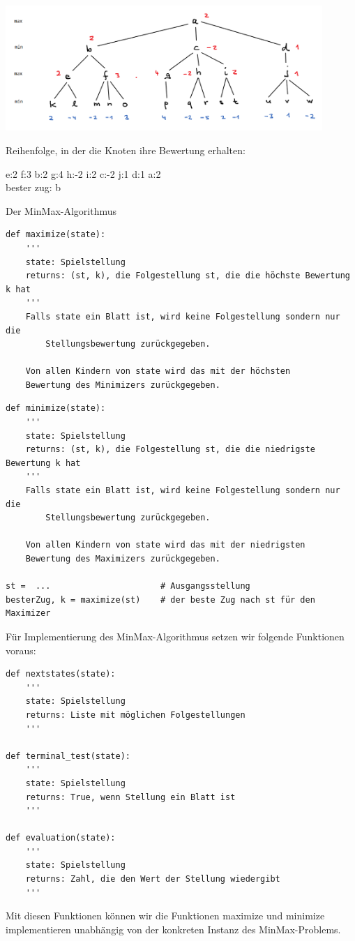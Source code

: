 \documentclass{beamer}
\begin{document}
\begin{frame}[fragile]


\includegraphics[width=12cm]{bild11.png} 

Reihenfolge, in der die Knoten ihre 
Bewertung erhalten:

e:2 f:3 b:2 g:4 h:-2 i:2 c:-2 j:1 d:1 a:2 \\
bester zug: b

\end{frame}

\begin{frame}[fragile]
Der MinMax-Algorithmus
\begin{lstlisting}[basicstyle=\tiny]
def maximize(state):
    '''
    state: Spielstellung
    returns: (st, k), die Folgestellung st, die die höchste Bewertung k hat
    '''
    Falls state ein Blatt ist, wird keine Folgestellung sondern nur die 
        Stellungsbewertung zurückgegeben.
    
    Von allen Kindern von state wird das mit der höchsten
    Bewertung des Minimizers zurückgegeben.
\end{lstlisting} 
\begin{lstlisting}[basicstyle=\tiny]
def minimize(state):
    '''
    state: Spielstellung
    returns: (st, k), die Folgestellung st, die die niedrigste Bewertung k hat
    '''
    Falls state ein Blatt ist, wird keine Folgestellung sondern nur die 
        Stellungsbewertung zurückgegeben.
    
    Von allen Kindern von state wird das mit der niedrigsten
    Bewertung des Maximizers zurückgegeben.
    
st =  ...                      # Ausgangsstellung
besterZug, k = maximize(st)    # der beste Zug nach st für den Maximizer
\end{lstlisting} 
\end{frame}

\begin{frame}[fragile]
Für Implementierung des MinMax-Algorithmus setzen wir folgende Funktionen voraus:
\begin{lstlisting}[basicstyle=\tiny]
def nextstates(state):
    '''
    state: Spielstellung
    returns: Liste mit möglichen Folgestellungen
    '''

def terminal_test(state):
    '''
    state: Spielstellung
    returns: True, wenn Stellung ein Blatt ist
    '''

def evaluation(state):
    '''
    state: Spielstellung
    returns: Zahl, die den Wert der Stellung wiedergibt
    '''
\end{lstlisting} 
Mit diesen Funktionen können wir die Funktionen maximize und minimize implementieren unabhängig von 
der konkreten Instanz des MinMax-Problems.
\end{frame}
\end{document}
